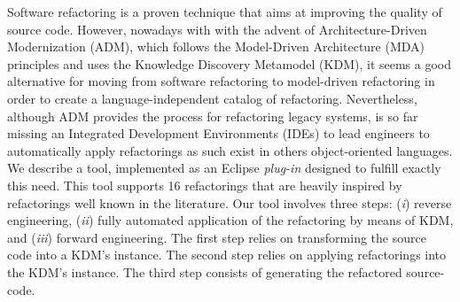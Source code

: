 

Software refactoring is a proven technique that aims at improving the quality of source code.
 However, nowadays with with the advent of Architecture-Driven Modernization (ADM), 
which follows the Model-Driven Architecture (MDA) principles and uses the Knowledge Discovery Metamodel (KDM), 
it seems a good alternative for moving from software refactoring to model-driven refactoring in order to create a language-independent catalog of refactoring. 
Nevertheless, although ADM provides the process for refactoring legacy systems, is so far missing an Integrated Development Environments (IDEs) 
to lead engineers to automatically apply refactorings as such exist in others object-oriented languages.
 We describe a tool, implemented as an Eclipse \textit{plug-in} designed to fulfill exactly this need. 
This tool supports 16 refactorings that are heavily inspired by refactorings well known in the literature. 
Our tool involves three steps: (\textit{i}) reverse engineering, (\textit{ii}) fully automated application of the refactoring by means of KDM,
 and (\textit{iii}) forward engineering. 
The first step relies on transforming the source code into a KDM's instance. 
The second step relies on applying refactorings into the KDM's instance. 
The third step consists of generating the refactored source-code.


